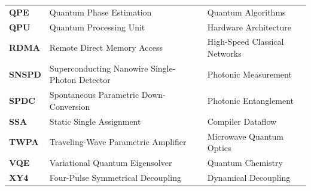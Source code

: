\begin{xltabular}{\textwidth}{p{2.4cm} p{7.2cm} X}
    \textbf{QPE} & Quantum Phase Estimation & Quantum Algorithms \\
    \textbf{QPU} & Quantum Processing Unit & Hardware Architecture \\
    \textbf{RDMA} & Remote Direct Memory Access & High-Speed Classical Networks \\
    \textbf{SNSPD} & Superconducting Nanowire Single-Photon Detector & Photonic Measurement \\
    \textbf{SPDC} & Spontaneous Parametric Down-Conversion & Photonic Entanglement \\
    \textbf{SSA} & Static Single Assignment & Compiler Dataflow \\
    \textbf{TWPA} & Traveling-Wave Parametric Amplifier & Microwave Quantum Optics \\
    \textbf{VQE} & Variational Quantum Eigensolver & Quantum Chemistry \\
    \textbf{XY4} & Four-Pulse Symmetrical Decoupling & Dynamical Decoupling \\
\end{xltabular}

